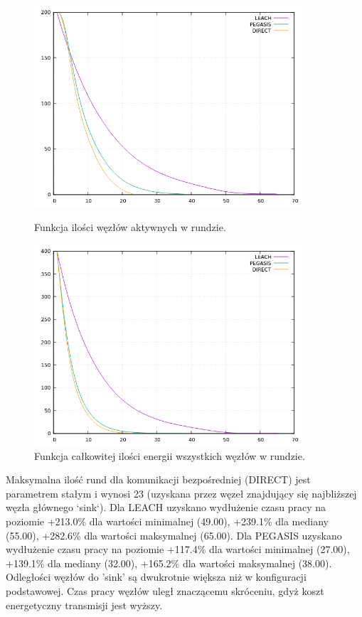 \documentclass[a4paper,12pt,twoside,openany]{report}
\begin{document}
\begin{figure}[H]
 \centering
 \includegraphics[width=10cm]{images/gnuplot/test_3/nodes_in_round_xy400.png}
 \caption{Funkcja ilości węzłów aktywnych w rundzie.}
 \includegraphics[width=10cm]{images/gnuplot/test_3/energy_in_round_xy400.png}
 \caption{Funkcja całkowitej ilości energii wszystkich węzłów w rundzie.}
\end{figure}

\par
Maksymalna ilość rund dla komunikacji bezpośredniej (DIRECT) jest parametrem stałym i wynosi 23 (uzyskana przez węzeł znajdujący się najbliższej węzła głównego `sink`).
Dla LEACH uzyskano wydłużenie czasu pracy na poziomie +213.0\% dla wartości minimalnej (49.00), +239.1\% dla mediany (55.00), +282.6\% dla wartości maksymalnej (65.00).
Dla PEGASIS uzyskano wydłużenie czasu pracy na poziomie +117.4\% dla wartości minimalnej (27.00), +139.1\% dla mediany (32.00), +165.2\% dla wartości maksymalnej (38.00).
Odległości węzłów do 'sink' są dwukrotnie większa niż w konfiguracji podstawowej. Czas pracy węzłów uległ znaczącemu skróceniu, gdyż koszt energetyczny transmisji jest wyższy.
\end{document}
